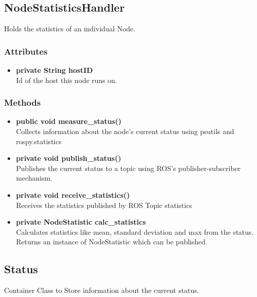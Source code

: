 \subsection{NodeStatisticsHandler}
Holds the statistics of an individual Node.

\subsubsection{Attributes}
\begin{itemize}
	\item \textbf{private String hostID}\\
	Id of the host this node runs on.
\end{itemize}

\subsubsection{Methods}
\begin{itemize}
	\item \textbf{public void measure\_status()}\\
	Collects information about the node's current status using psutils and rospy.statistics
	\item \textbf{private void publish\_status()}\\
	Publishes the current status to a topic using ROS's publisher-subscriber mechanism.
	\item \textbf{private void receive\_statistics()}\\
	Receives the statistics published by ROS Topic statistics
	\item \textbf{private NodeStatistic calc\_statistics}\\
	Calculates statistics like mean, standard deviation and max from the status.
	Returns an instance of NodeStatistic which can be published.
\end{itemize}

\subsection{Status}
Container Class to Store information about the current status.


